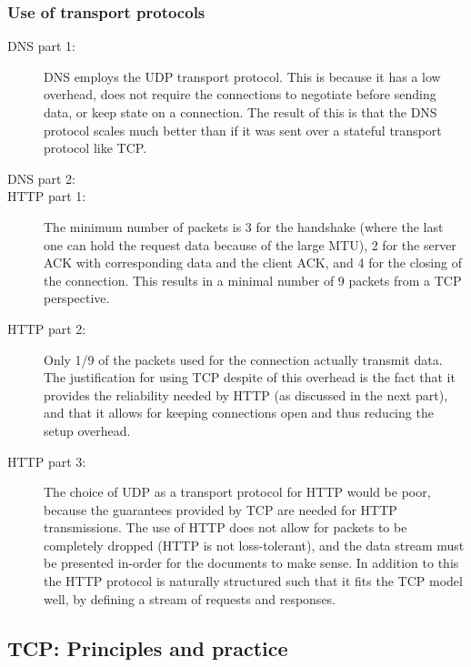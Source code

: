\subsubsection{Use of transport protocols}
\begin{description}
    \item[DNS part 1:] DNS employs the UDP transport protocol. This is because it has a low overhead, does not require
        the connections to negotiate before sending data, or keep state on a connection. The result of this is that the DNS
        protocol scales much better than if it was sent over a stateful transport protocol like TCP. %
    \item[DNS part 2:] 

    \item[HTTP part 1:] The minimum number of packets is 3 for the handshake (where the last one can hold the request data because
        of the large MTU), 2 for the server ACK with corresponding data and the client ACK, and 4 for the closing of the connection.
        This results in a minimal number of 9 packets from a TCP perspective.
    \item[HTTP part 2:] Only 1/9 of the packets used for the connection actually transmit data. The justification for using
        TCP despite of this overhead is the fact that it provides the reliability needed by HTTP (as discussed in the next part), and
        that it allows for keeping connections open and thus reducing the setup overhead.
    \item[HTTP part 3:] The choice of UDP as a transport protocol for HTTP would be poor, because the guarantees provided by
        TCP are needed for HTTP transmissions. The use of HTTP does not allow for packets to be completely dropped (HTTP is not
        loss-tolerant), and the data stream must be presented in-order for the documents to make sense. In addition to this the
        HTTP protocol is naturally structured such that it fits the TCP model well, by defining a stream of requests and responses.
\end{description}

\subsection{TCP: Principles and practice}

